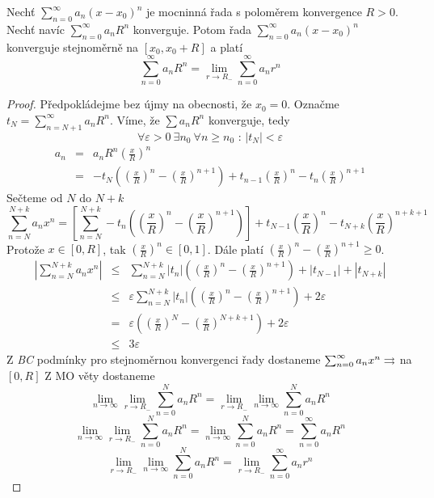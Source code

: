 \begin{vetat}[Abelova]
Nechť $\sum_{n=0}^{\infty} a_n (x-x_0)^n$ je mocninná řada s poloměrem konvergence $R > 0$. Nechť navíc $\sum_{n=0}^{\infty} a_n R^n$ konverguje. Potom řada $\sum_{n=0}^{\infty} a_n (x-x_0)^n$ konverguje stejnoměrně na $[ x_0, x_0 + R ]$ a platí
$$\sum_{n=0}^{\infty} a_n R^n = \lim_{r \rightarrow R_-} \sum_{n=0}^{\infty} a_n r^n$$
\end{vetat}

\begin{proof}
Předpokládejme bez újmy na obecnosti, že $x_0 = 0$. Označme $t_N = \sum_{n=N+1}^{\infty} a_n R^n$. Víme, že $\sum a_n R^n$ konverguje, tedy
$$\forall \varepsilon>0 \ \exists n_0 \ \forall n \geq n_0 \textrm{ : } |t_N| < \varepsilon$$
\begin{eqnarray*}
a_n & = & a_n R^n \left( \frac{x}{R} \right)^n \\
& = & - t_N \left( \left( \frac{x}{R} \right)^n - \left( \frac{x}{R} \right)^{n+1} \right) + t_{n-1} \left( \frac{x}{R} \right)^n - t_n \left( \frac{x}{R} \right)^{n+1} 
\end{eqnarray*}
Sečteme od $N$ do $N+k$
$$\sum_{n=N}^{N+k} a_n x^n = \left[ \sum_{n=N}^{N+k} -t_n \left( \left( \frac{x}{R} \right)^n - \left( \frac{x}{R} \right)^{n+1} \right) \right] + t_{N-1} \left( \frac{x}{R} \right)^n - t_{N+k} \left( \frac{x}{R} \right)^{n+k+1}$$
Protože $x \in [0, R]$, tak $\left( \frac{x}{R} \right)^n \in [0,1]$. Dále platí $\left( \frac{x}{R} \right)^{n} - \left( \frac{x}{R} \right)^{n+1} \geq 0$.
\begin{eqnarray*}
\left|\sum_{n=N}^{N+k} a_n x^n \right| & \leq & \sum_{n=N}^{N+k} |t_n| \left( \left( \frac{x}{R} \right)^{n} - \left( \frac{x}{R} \right)^{n+1} \right) + |t_{N-1}| + |t_{N+k}| \\
& \leq & \varepsilon \sum_{n=N}^{N+k} |t_n| \left( \left( \frac{x}{R} \right)^{n} - \left( \frac{x}{R} \right)^{n+1} \right) + 2 \varepsilon \\
& = & \varepsilon \left( \left( \frac{x}{R} \right)^{N} - \left( \frac{x}{R} \right)^{N+k+1} \right) + 2 \varepsilon \\
& \leq & 3 \varepsilon 
\end{eqnarray*}
Z \emph{BC} podmínky pro stejnoměrnou konvergenci řady dostaneme $\sum_{n=0}^{\infty} a_n x^n \rightrightarrows$ na $[0, R]$
Z MO věty dostaneme
$$\lim_{n \rightarrow \infty} \lim_{r \rightarrow R_-} \sum_{n=0}^{N} a_n R^n = \lim_{r \rightarrow R_-} \lim_{n \rightarrow \infty} \sum_{n=0}^{N} a_n R^n$$
$$\lim_{n \rightarrow \infty} \lim_{r \rightarrow R_-} \sum_{n=0}^{N} a_n R^n = \lim_{n \rightarrow \infty} \sum_{n=0}^{N} a_n R^n = \sum_{n=0}^{\infty} a_n R^n$$
$$\lim_{r \rightarrow R_-} \lim_{n \rightarrow \infty} \sum_{n=0}^{N} a_n R^n = \lim_{r \rightarrow R_-} \sum_{n=0}^{\infty} a_n r^n$$
\end{proof}


